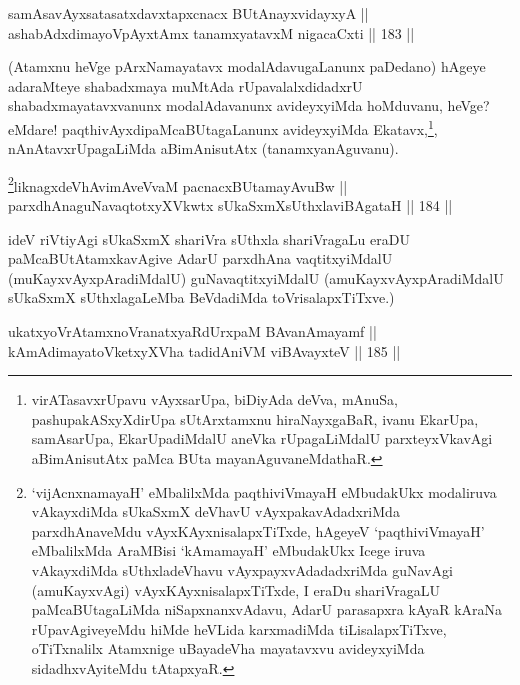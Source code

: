 
\begin{shl}
samAsavAyxsatasatxdavxtapxcnacx BUtAnayxvidayxyA || \\
ashabAdxdimayoV\s pAyxtAmx tanamxyatavxM nigacaCxti \hfill || 183 ||  
\end{shl}

\begin{artha}
(Atamxnu heVge pArxNamayatavx modalAdavugaLanunx paDedano) hAgeye
adaraMteye shabadxmaya muMtAda rUpavalalxdidadxrU
shabadxmayatavxvanunx modalAdavanunx avideyxyiMda hoMduvanu, heVge?
eMdare! paqthivAyxdipaMcaBUtagaLanunx avideyxyiMda
Ekatavx,\footnote{virATasavxrUpavu vAyxsarUpa, biDiyAda deVva,
mAnuSa, pashupakASxyXdirUpa sUtArxtamxnu hiraNayxgaBaR, ivanu
EkarUpa, samAsarUpa, EkarUpadiMdalU aneVka rUpagaLiMdalU
parxteyxVkavAgi aBimAnisutAtx paMca BUta mayanAguvaneMdathaR.}, nAnAtavx\footnotemark rUpagaLiMda aBimAnisutAtx
(tanamxyanAguvanu).
\end{artha}


\begin{shl}
\footnote{`vijAcnxnamayaH' eMbalilxMda paqthiviVmayaH eMbudakUkx modaliruva vAkayxdiMda sUkaSxmX deVhavU
vAyxpakavAdadxriMda parxdhAnaveMdu vAyxKAyxnisalapxTiTxde, hAgeyeV
`paqthiviVmayaH' eMbalilxMda AraMBisi `kAmamayaH' eMbudakUkx Icege
iruva vAkayxdiMda sUthxladeVhavu vAyxpayxvAdadadxriMda guNavAgi
(amuKayxvAgi) vAyxKAyxnisalapxTiTxde, I eraDu shariVragaLU
paMcaBUtagaLiMda niSapxnanxvAdavu, AdarU parasapxra kAyaR kAraNa
rUpavAgiveyeMdu hiMde heVLida karxmadiMda tiLisalapxTiTxve,
oTiTxnalilx Atamxnige uBayadeVha mayatavxvu avideyxyiMda
sidadhxvAyiteMdu tAtapxyaR.}liknagxdeVhAvimAveVvaM pacnacxBUtamayAvuBw || \\
parxdhAnaguNavaqtotxyXVkwtx sUkaSxmXsUthxlaviBAgataH \hfill || 184 ||  
\end{shl}

\begin{artha}
ideV riVtiyAgi sUkaSxmX shariVra sUthxla shariVragaLu eraDU
paMcaBUtAtamxkavAgive AdarU parxdhAna vaqtitxyiMdalU
(muKayxvAyxpAradiMdalU) guNavaqtitxyiMdalU (amuKayxvAyxpAradiMdalU
sUkaSxmX sUthxlagaLeMba BeVdadiMda toVrisalapxTiTxve.)
\end{artha}


\begin{shl}
ukatxyoVrAtamxnoVranatxyaRdUrxpaM BAvanAmayamf || \\
kAmAdimayatoVketxyXVha tadidAniVM viBAvayxteV \hfill || 185 ||  
\end{shl}

